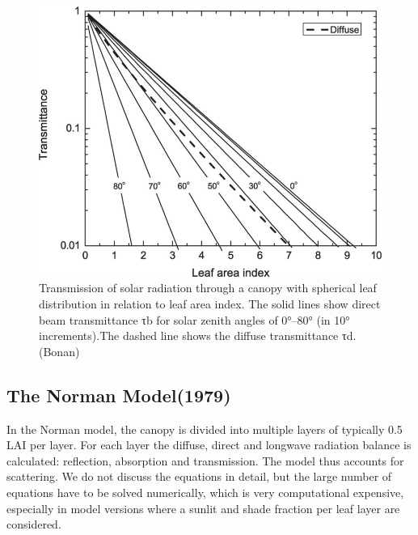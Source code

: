 \documentclass[12pt,oneside]{book}
\begin{document}
\begin{figure}

{\centering \includegraphics[width=0.8\linewidth]{figures/chap3/f318_diff_dir_trans} 

}

\caption{Transmission of solar radiation through a canopy with spherical leaf distribution in relation to leaf area index. The solid lines show direct beam transmittance τb for solar zenith angles of 0°–80° (in 10° increments).The dashed line shows the diffuse transmittance τd. (Bonan)}\label{fig:f318}
\end{figure}

\subsection{The Norman Model(1979)}\label{the-norman-model1979}

In the Norman model, the canopy is divided into multiple layers of
typically 0.5 LAI per layer. For each layer the diffuse, direct and
longwave radiation balance is calculated: reflection, absorption and
transmission. The model thus accounts for scattering. We do not discuss
the equations in detail, but the large number of equations have to be
solved numerically, which is very computational expensive, especially in
model versions where a sunlit and shade fraction per leaf layer are
considered.
\end{document}
